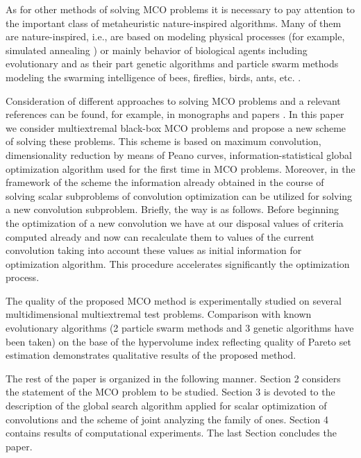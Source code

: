 \documentclass[]{interact}
\theoremstyle{plain}%
\theoremstyle{definition}
\theoremstyle{remark}
\begin{document}
As for other methods of solving MCO problems it is necessary to pay attention to the important class of metaheuristic nature-inspired algorithms. Many of them are nature-inspired, i.e.,  are  based on modeling physical processes (for example, simulated annealing \cite{Locatelli2002,Aarts2014}) or mainly behavior of biological agents including evolutionary \cite{Price2005,Coello2007} and as their part genetic algorithms \cite{Ruiz2015,Deb2002,Zitzler2001} and particle swarm methods modeling the swarming intelligence of bees, fireflies, birds, ants, etc. \cite{Mostaghim2007,Nebro2009,Durillo2010}.

Consideration of different approaches to solving MCO problems and a relevant references can be found, for example, in monographs and papers \cite{Miettinen1999,Ehrgott2005,Zhou2011,Nedjah2015,Pardalos2017}.
In this paper we consider multiextremal black-box MCO problems and propose a new scheme of solving these problems. This scheme is based on maximum convolution, dimensionality reduction by means of Peano curves, information-statistical global optimization algorithm used for the first time in MCO problems. Moreover, in the framework of the scheme the information already obtained in the course of solving scalar subproblems of convolution optimization can be utilized for solving a new convolution subproblem. Briefly, the way is as follows. Before beginning the optimization of a new convolution we have at our disposal values of criteria computed already and now can recalculate them to values of the current convolution taking into account these values as initial information for optimization algorithm. This procedure accelerates significantly the optimization process.

The quality of the proposed MCO method is experimentally studied on several multidimensional multiextremal test problems. Comparison with known evolutionary algorithms (2 particle swarm methods and 3 genetic algorithms have been taken) on the base of the hypervolume index \cite{Evtushenko2014,Zilinskas2015} reflecting quality of Pareto set estimation demonstrates qualitative results of the proposed method.

The rest of the paper is organized in the following manner. Section 2 considers the statement of the MCO problem to be studied. Section 3 is devoted to the description of the global search algorithm applied for scalar optimization of convolutions and the scheme of joint analyzing the family of ones. Section 4 contains results of computational experiments. The last Section concludes the paper.
\end{document}
